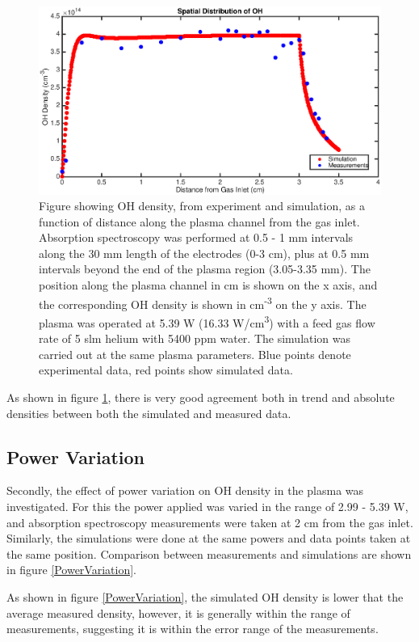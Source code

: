 \documentclass[11pt, oneside]{article}   	%
\begin{document}
\begin{figure}
\includegraphics[width=\textwidth]{Figures/SpatialGraph}
\caption{
Figure showing OH density, from experiment and simulation, as a function of distance along the plasma channel from the gas inlet. Absorption spectroscopy was performed at 0.5 - 1 mm intervals along the 30 mm length of the electrodes (0-3 cm), plus at 0.5 mm intervals beyond the end of the plasma region (3.05-3.35 mm). The position along the plasma channel in cm is shown on the x axis, and the corresponding OH density is shown in cm\textsuperscript{-3} on the y axis. The plasma was operated at 5.39 W (16.33 W/cm\textsuperscript{3}) with a feed gas flow rate of 5 slm helium with 5400 ppm water. 
The simulation was carried out at the same plasma parameters.
Blue points denote experimental data, red points show simulated data.}
\label{SpatialGraph}
\end{figure}

As shown in figure \ref{SpatialGraph}, there is very good agreement both in trend and absolute densities between both the simulated and measured data.

\subsection{Power Variation}

Secondly, the effect of power variation on OH density in the plasma was investigated.
For this the power applied was varied in the range of 2.99 - 5.39 W, and absorption spectroscopy measurements were taken at 2 cm from the gas inlet.
Similarly, the simulations were done at the same powers and data points taken at the same position.
Comparison between measurements and simulations are shown in figure \ref{PowerVariation}.

As shown in figure \ref{PowerVariation}, the simulated OH density is lower that the average measured density, however, it is generally within the range of measurements, suggesting it is within the error range of the measurements.
\end{document}

